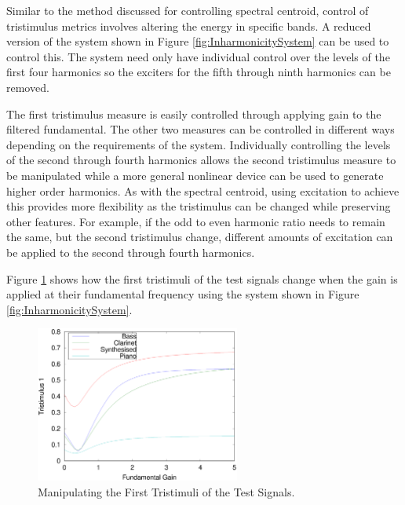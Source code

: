 			Similar to the method discussed for controlling spectral centroid, control of tristimulus metrics
			involves altering the energy in specific bands. A reduced version of the system shown in Figure
			\ref{fig:InharmonicitySystem} can be used to control this. The system need only have individual
			control over the levels of the first four harmonics so the exciters for the fifth through ninth
			harmonics can be removed.

			The first tristimulus measure is easily controlled through applying gain to the filtered
			fundamental. The other two measures can be controlled in different ways depending on the
			requirements of the system.  Individually controlling the levels of the second through fourth
			harmonics allows the second tristimulus measure to be manipulated while a more general nonlinear
			device can be used to generate higher order harmonics. As with the spectral centroid, using
			excitation to achieve this provides more flexibility as the tristimulus can be changed while
			preserving other features. For example, if the odd to even harmonic ratio needs to remain the same,
			but the second tristimulus change, different amounts of excitation can be applied to the second
			through fourth harmonics.

			Figure \ref{fig:MoveTristimulus1} shows how the first tristimuli of the test signals change when
			the gain is applied at their fundamental frequency using the system shown in Figure
			\ref{fig:InharmonicitySystem}.

			\begin{figure}[h!]
				\centering
				\includegraphics[width=0.6\textwidth]{chapter6/Images/MoveTristimulus1.eps}
				\caption{Manipulating the First Tristimuli of the Test Signals.}
				\label{fig:MoveTristimulus1}
			\end{figure}

